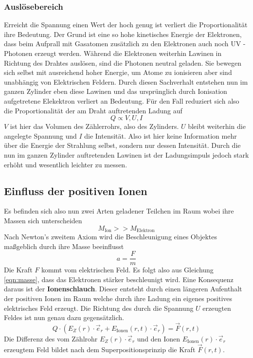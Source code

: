 \subsubsection{Auslösebereich}
Erreicht die Spannung einen Wert der hoch genug ist verliert die Proportionalität ihre Bedeutung. 
Der Grund ist eine so hohe kinetisches Energie der Elektronen, dass beim Aufprall mit Gasatomen zusätzlich zu den Elektronen auch noch UV - Photonen erzeugt werden. 
Während die Elektronen weiterhin Lawinen 
in Richtung des Drahtes auslösen, sind die Photonen neutral geladen. Sie bewegen sich selbst mit ausreichend hoher Energie, um Atome zu ionisieren aber sind unabhängig von 
Elektrischen Feldern. Durch diesen Sachverhalt entstehen nun im ganzen Zylinder eben diese Lawinen und das ursprünglich durch Ionisation aufgetretene Elekektron verliert an Bedeutung.
Für den Fall reduziert sich also die Proportionalität der am Draht auftretenden Ladung auf
\begin{equation*}
\label{eqn:prop3}
Q \propto V, U, I
\end{equation*}
$V$ ist hier das Volumen des Zählerrohrs, also des Zylinders. $U$ bleibt weiterhin die angelegte Spannung und $I$ die Intensität.
Also ist hier keine Information mehr über die Energie der Strahlung selbst, sondern nur dessen Intensität.
Durch die nun im ganzen Zylinder auftretenden Lawinen ist der Ladungsimpuls jedoch stark erhöht und wesentlich leichter zu messen.

\subsection{Einfluss der positiven Ionen}
Es befinden sich also nun zwei Arten geladener Teilchen im Raum wobei ihre Massen sich unterscheiden
\begin{equation}
\label{eqn:masse}
M_\text{Ion} >> M_\text{Elektron}
\end{equation}
Nach Newton's zweitem Axiom wird die Beschleunigung eines Objektes maßgeblich durch ihre Masse beeinflusst
\begin{equation}
\label{eqn:masse}
a= \frac{F}{m}
\end{equation}
Die Kraft $F$ kommt vom elektrischen Feld. Es folgt also aus Gleichung \eqref{eqn:masse}, dass das Elektronen stärker beschleunigt wird. Eine Konsequenz daraus ist der \textbf{Ionenschlauch}. Dieser entsteht
durch einen längeren Aufenthalt der positiven Ionen im Raum welche durch ihre Ladung ein eigenes positives elektrisches Feld erzeugt. Die Richtung des durch die Spannung $U$ erzeugten Feldes ist nun genau dazu gegensätzlich.
\begin{equation*}
\label{eqn:Felder}
Q \cdot (E_Z(r)\cdot \vec{e}_r + E_\text{Ionen}(r,t) \cdot \vec{e}_r) = \vec{F}(r,t)
\end{equation*}
Die Differenz des vom Zählrohr $E_Z(r)\cdot \vec{e}_r$ und den Ionen $E_\text{Ionen}(r) \cdot \vec{e}_r$ erzeugtem Feld bildet nach dem Superpositionsprinzip  die Kraft $\vec{F}(r,t)$.
